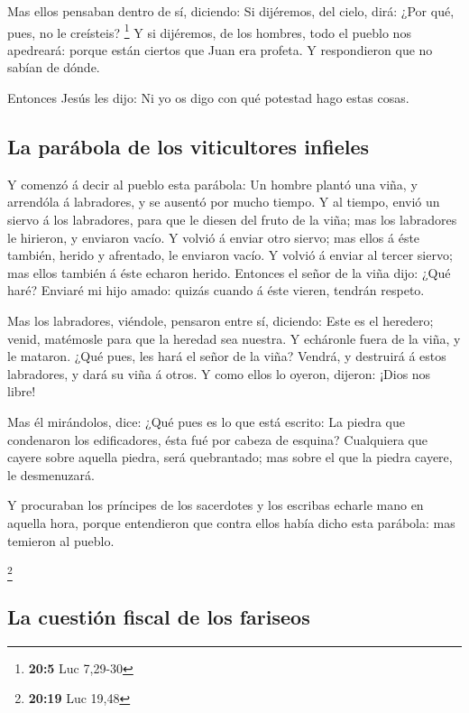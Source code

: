  Mas ellos pensaban dentro de sí, diciendo: Si dijéremos,
del cielo, dirá: ¿Por qué, pues, no le creísteis? \footnote{\textbf{20:5}
  Luc 7,29-30}  Y si dijéremos, de los hombres, todo el
pueblo nos apedreará: porque están ciertos que Juan era profeta.
 Y respondieron que no sabían de dónde.

 Entonces Jesús les dijo: Ni yo os digo con qué potestad
hago estas cosas.

\hypertarget{la-paruxe1bola-de-los-viticultores-infieles}{%
\subsection{La parábola de los viticultores
infieles}\label{la-paruxe1bola-de-los-viticultores-infieles}}

 Y comenzó á decir al pueblo esta parábola: Un hombre
plantó una viña, y arrendóla á labradores, y se ausentó por mucho
tiempo.  Y al tiempo, envió un siervo á los labradores,
para que le diesen del fruto de la viña; mas los labradores le hirieron,
y enviaron vacío.  Y volvió á enviar otro siervo; mas
ellos á éste también, herido y afrentado, le enviaron vacío.
 Y volvió á enviar al tercer siervo; mas ellos también á
éste echaron herido.  Entonces el señor de la viña dijo:
¿Qué haré? Enviaré mi hijo amado: quizás cuando á éste vieren, tendrán
respeto.

 Mas los labradores, viéndole, pensaron entre sí,
diciendo: Este es el heredero; venid, matémosle para que la heredad sea
nuestra.  Y echáronle fuera de la viña, y le mataron.
¿Qué pues, les hará el señor de la viña?  Vendrá, y
destruirá á estos labradores, y dará su viña á otros. Y como ellos lo
oyeron, dijeron: ¡Dios nos libre!

 Mas él mirándolos, dice: ¿Qué pues es lo que está
escrito: La piedra que condenaron los edificadores, ésta fué por cabeza
de esquina?  Cualquiera que cayere sobre aquella piedra,
será quebrantado; mas sobre el que la piedra cayere, le desmenuzará.

 Y procuraban los príncipes de los sacerdotes y los
escribas echarle mano en aquella hora, porque entendieron que contra
ellos había dicho esta parábola: mas temieron al pueblo.

\footnote{\textbf{20:19} Luc 19,48}

\hypertarget{la-cuestiuxf3n-fiscal-de-los-fariseos}{%
\subsection{La cuestión fiscal de los
fariseos}\label{la-cuestiuxf3n-fiscal-de-los-fariseos}}

